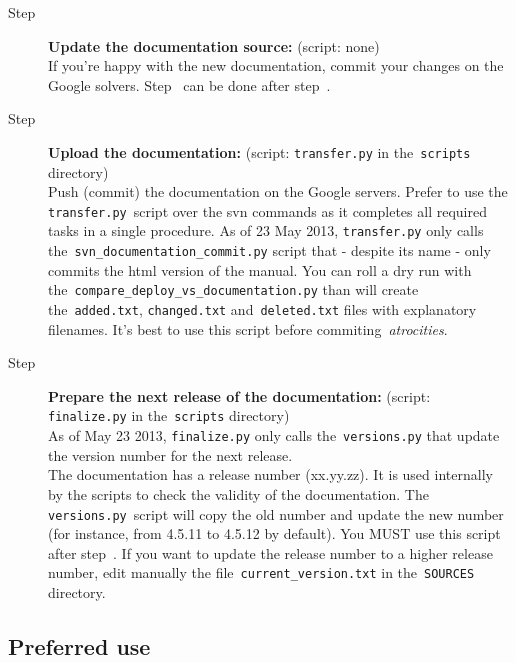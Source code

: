 \documentclass[a4paper,10pt]{article}
\newcommand{\code}[1]{\texttt{#1}}
\begin{document}
\begin{description}
 \item[Step ] {\bf Update the documentation source:} (script: none)\\If you're happy with the new documentation, commit your changes on the Google solvers. Step~ can be done after step~.

 \item[Step ] {\bf Upload the documentation:} (script: \code{transfer.py} in the~\code{scripts} directory)\\Push (commit) the documentation on the Google servers. Prefer to use the \code{transfer.py}~script over the svn commands as it completes all required tasks in a single procedure. As of 23 May 2013, \code{transfer.py} only calls the~\code{svn\_documentation\_commit.py} script
that - despite its name - only commits the html version of the manual. You can roll a dry run with the~\code{compare\_deploy\_vs\_documentation.py} than will create the~\code{added.txt}, \code{changed.txt} and~\code{deleted.txt} files with explanatory filenames. It's best to use this script before commiting~\emph{atrocities}.

 \item[Step ] {\bf Prepare the next release of the documentation:} (script: \code{finalize.py} in the~\code{scripts} directory)\\As of May 23 2013, \code{finalize.py} only calls the~\code{versions.py} that update the version number for the next release.\\

The documentation has a release number (xx.yy.zz). It is used internally by the scripts to check the validity of the documentation. The \code{versions.py}~script will copy the old number and update the new number (for instance, from 4.5.11 to 4.5.12 by default). You MUST use this script after step~. If you want to update the release number to a higher release number, edit manually the file~\code{current\_version.txt} in the~\code{SOURCES} directory.
\end{description}

\subsection{Preferred use}
\end{document}
